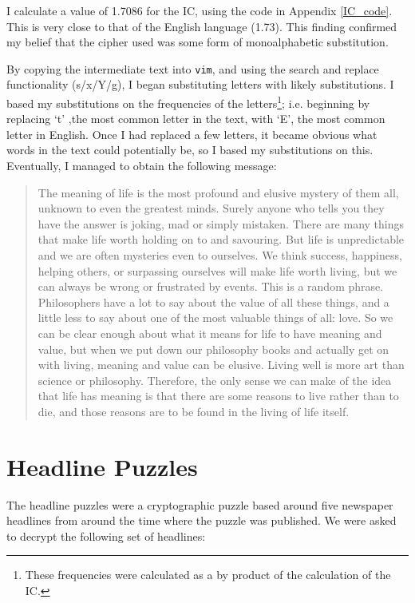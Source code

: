 \documentclass[11pt,a4paper,twoside]{article}
\begin{document}
I calculate a value of 1.7086 for the IC, using the code in Appendix
\ref{IC_code}.  This is very close to that of the English language (1.73). This
finding confirmed my belief that the cipher used was some form of
monoalphabetic substitution.  

By copying the intermediate text into {\tt vim}, and using the search and
replace functionality (s/x/Y/g), I began substituting letters with likely
substitutions. I based my substitutions on the frequencies of the
letters\footnote{These frequencies were calculated as a by product of the
calculation of the IC. }; i.e. beginning by replacing `t' ,the most common
letter in the text, with `E', the most common letter in English. Once I had
replaced a few letters, it became obvious what words in the text could
potentially be, so I based my substitutions on this. Eventually, I managed to
obtain the following message: 

\begin{quote}
\small
\raggedright
The meaning of life is the most profound and elusive mystery of them all,
unknown to even the greatest minds. Surely anyone who tells you they have the
answer is joking, mad or simply mistaken.  There are many things that make life
worth holding on to and savouring. But life is unpredictable and we are often
mysteries even to ourselves. We think success, happiness, helping others, or
surpassing ourselves will make life worth living, but we can always be wrong or
frustrated by events.  This is a random phrase.  Philosophers have a lot to say
about the value of all these things, and a little less to say about one of the
most valuable things of all: love. So we can be clear enough about what it
means for life to have meaning and value, but when we put down our philosophy
books and actually get on with living, meaning and value can be elusive. Living
well is more art than science or philosophy. Therefore,  the only sense we can
make of the idea that life has meaning is that there are some reasons to live
rather than to die, and those reasons are to be found in the living of life
itself.
\end{quote}

\vfill
\pagebreak
\section{Headline Puzzles}
The headline puzzles were a cryptographic puzzle based around five newspaper
headlines from around the time where the puzzle was published. We were asked to
decrypt the following set of headlines: 
\end{document}
